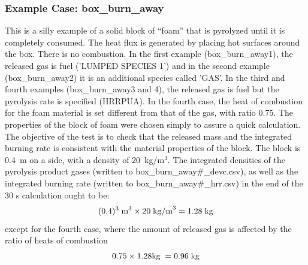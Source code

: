 \documentclass[11pt]{book}
\newcommand{\be}{\begin{equation}}
\newcommand{\ee}{\end{equation}}
\begin{document}
\subsubsection{Example Case: box\_burn\_away}

This is a silly example of a solid block of ``foam'' that is pyrolyzed
until it is completely consumed. The heat flux is generated by placing
hot surfaces around the box. There is no combustion.  In the first
example (box\_burn\_away1), the released gas is fuel ('LUMPED SPECIES 1')
and in the second example (box\_burn\_away2) it is an additional
species called 'GAS'. In the third and fourth examples
(box\_burn\_away3 and 4), the
released gas is fuel but the pyrolysis rate is specified (HRRPUA).
In the fourth case, the heat of combustion for the foam material is set
different from that of the gas, with ratio 0.75.
The properties of the block of foam were chosen
simply to assure a quick calculation. The objective of the test is to
check that the released mass and the integrated burning rate is
consistent with the material properties of the block. The block is
0.4~m on a side, with a density of 20~kg/m$^3$.  The integrated
densities of the pyrolysis product gases (written to
box\_burn\_away\#\_devc.csv), as well as
the integrated burning rate (written to box\_burn\_away\#\_hrr.csv) in
the end of the 30 s calculation ought to be:
\be
(0.4)^3 \; \hbox{m}^3 \times 20 \; \hbox{kg/m}^3 = 1.28 \; \hbox{kg}
\ee
except for the fourth case, where the amount of released gas is affected by
the ratio of heats of combustion
\be
0.75\times 1.28 \hbox{kg}\; = 0.96\; \hbox{kg}
\ee
\end{document}
